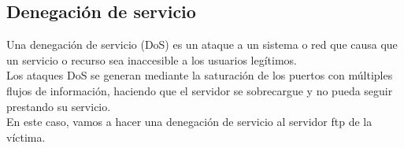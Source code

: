 \documentclass[a4,12pt,onecolum]{article}
\begin{document}

\clearpage
\subsection{Denegación de servicio}

Una denegación de servicio (DoS) es un ataque a un sistema o red que causa que un servicio o recurso sea inaccesible a los usuarios legítimos. \\

Los ataques DoS se generan mediante la saturación de los puertos con múltiples flujos de información, haciendo que el servidor se sobrecargue y no pueda seguir prestando su servicio. \\

En este caso, vamos a hacer una denegación de servicio al servidor ftp de la víctima.
\end{document}
